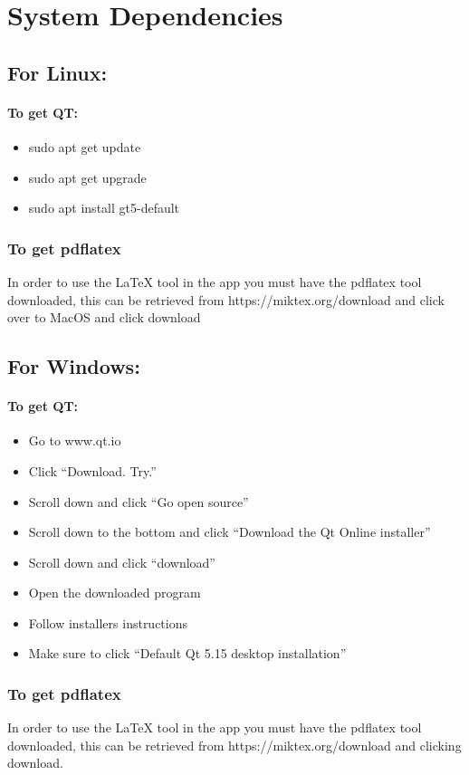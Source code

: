 \chapter{System Dependencies}
  \section{For Linux:}
  \subsubsection*{To get QT:}
    \begin{itemize}
      \item sudo apt get update
      \item sudo apt get upgrade
      \item sudo apt install gt5-default
    \end{itemize}
    \subsection*{To get pdflatex}
    In order to use the LaTeX tool in the app you must have the pdflatex tool downloaded, this can be retrieved from https://miktex.org/download and click over to MacOS and click download

  \bigskip
  \section{For Windows:}
  \subsubsection*{To get QT:}
    \begin{itemize}
      \item Go to www.qt.io
      \item Click “Download. Try.”
      \item Scroll down and click “Go open source”
      \item Scroll down to the bottom and click “Download the Qt Online installer”
      \item Scroll down and click “download”
      \item Open the downloaded program
      \item Follow installers instructions
      \item Make sure to click “Default Qt 5.15 desktop installation”
    \end{itemize}
    \subsection{To get pdflatex}
    In order to use the LaTeX tool in the app you must have the pdflatex tool downloaded, this can be retrieved from https://miktex.org/download and clicking download.

